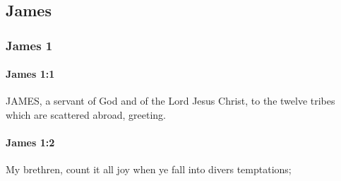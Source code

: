 \subsection{James}
	\label{JAMES}
	
	\subsubsection{James 1} %
		\label{JAMES-1}
		
		\paragraph{James 1:1} %
			\label{JAMES-1-1}

			JAMES, a servant of God and of the Lord Jesus Christ, to the twelve tribes which are scattered abroad, greeting.

			\begin{framed}
			\scriptsize
				\begin{compactdesc}
					\item[SBLG] 
				\end{compactdesc}
			\end{framed}

		\paragraph{James 1:2} %
			\label{JAMES-1-2}

			My brethren, count it all joy when ye fall into divers temptations;

